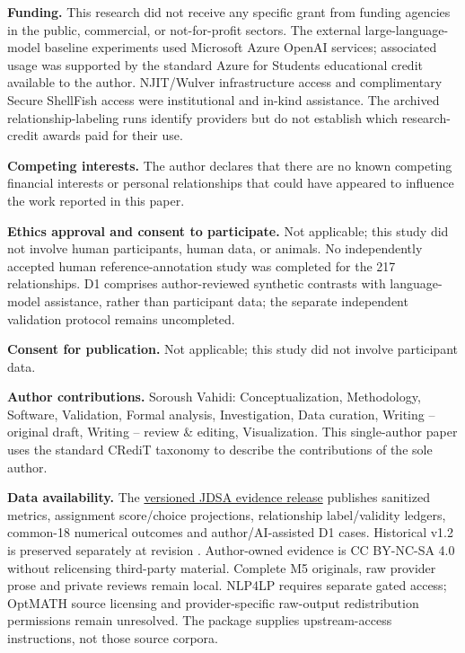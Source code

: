 \documentclass[pdflatex,iicol,sn-basic,Numbered]{sn-jnl}
\begin{document}
\noindent\textbf{Funding.} This research did not receive any specific grant from funding agencies in the public, commercial, or not-for-profit sectors. The external large-language-model baseline experiments used Microsoft Azure OpenAI services; associated usage was supported by the standard Azure for Students educational credit available to the author. NJIT/Wulver infrastructure access and complimentary Secure ShellFish access were institutional and in-kind assistance. The archived relationship-labeling runs identify providers but do not establish which research-credit awards paid for their use.

\noindent\textbf{Competing interests.} The author declares that there are no known competing financial interests or personal relationships that could have appeared to influence the work reported in this paper.

\noindent\textbf{Ethics approval and consent to participate.} Not applicable; this study did not involve human participants, human data, or animals. No independently accepted human reference-annotation study was completed for the 217 relationships. D1 comprises author-reviewed synthetic contrasts with language-model assistance, rather than participant data; the separate independent validation protocol remains uncompleted.

\noindent\textbf{Consent for publication.} Not applicable; this study did not involve participant data.

\noindent\textbf{Author contributions.} Soroush Vahidi: Conceptualization, Methodology, Software, Validation, Formal analysis, Investigation, Data curation, Writing -- original draft, Writing -- review \& editing, Visualization. This single-author paper uses the standard CRediT taxonomy to describe the contributions of the sole author.

\noindent\textbf{Data availability.} The \href{https://huggingface.co/datasets/SoroushVahidi/nl-optimization-instantiation-metrics/tree/f94012872211ab6a828147bb138fbe8ab695b982/releases/jdsa-evidence-v2.0.0}{versioned JDSA evidence release} publishes sanitized metrics, assignment score/choice projections, relationship label/validity ledgers, common-18 numerical outcomes and author/AI-assisted D1 cases. Historical v1.2 is preserved separately at revision . Author-owned evidence is CC BY-NC-SA 4.0 without relicensing third-party material. Complete M5 originals, raw provider prose and private reviews remain local. NLP4LP requires separate gated access; OptMATH source licensing and provider-specific raw-output redistribution permissions remain unresolved. The package supplies upstream-access instructions, not those source corpora.
\end{document}
